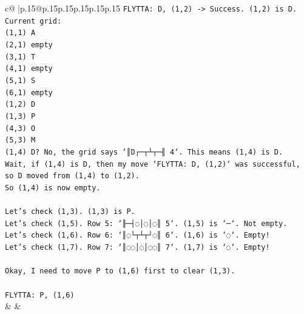 \documentclass{article}
\begin{document}
{\begin{supertabular}{c@{$\;$}|p{.15\linewidth}@{}p{.15\linewidth}p{.15\linewidth}p{.15\linewidth}p{.15\linewidth}p{.15\linewidth}}
{{{\texttt{FLYTTA: D, (1,2) {-}> Success. (1,2) is D.} \\
\texttt{Current grid:} \\
\texttt{(1,1) A} \\
\texttt{(2,1) empty} \\
\texttt{(3,1) T} \\
\texttt{(4,1) empty} \\
\texttt{(5,1) S} \\
\texttt{(6,1) empty} \\
\texttt{(1,2) D} \\
\texttt{(1,3) P} \\
\texttt{(4,3) O} \\
\texttt{(5,3) M} \\
\texttt{(1,4) D? No, the grid says `║D┌─┬┴┬─╢ 4`. This means (1,4) is D.} \\
\texttt{Wait, if (1,4) is D, then my move `FLYTTA: D, (1,2)` was successful, so D moved from (1,4) to (1,2).} \\
\texttt{So (1,4) is now empty.} \\
\\ 
\texttt{Let's check (1,3). (1,3) is P.} \\
\texttt{Let's check (1,5). Row 5: `╟─┤◌│◌│◌║ 5`. (1,5) is `─`. Not empty.} \\
\texttt{Let's check (1,6). Row 6: `║◌└┬┴┬┘◌║ 6`. (1,6) is `◌`. Empty!} \\
\texttt{Let's check (1,7). Row 7: `║◌◌│◌│◌◌║ 7`. (1,7) is `◌`. Empty!} \\
\\ 
\texttt{Okay, I need to move P to (1,6) first to clear (1,3).} \\
\\ 
\texttt{FLYTTA: P, (1,6)} \\
            }
        }
    }
    & & \\ \\


\end{supertabular}}
\end{document}
